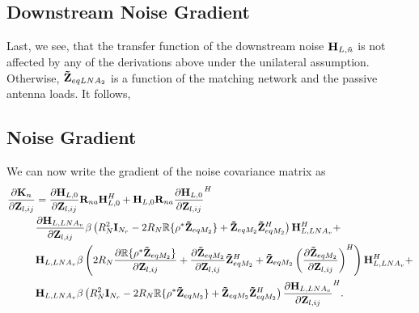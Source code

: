 \subsection{Downstream Noise Gradient}
\label{sec:down_noise_grad}
Last, we see, that the transfer function of the downstream noise $\mathbf{H}_{L,\tilde{n}}$ is not affected by any of the derivations above under the unilateral assumption.
Otherwise, $\mathbf{\tilde{Z}}_{eqLNA_2}$ is a function of the matching network and the passive antenna loads. It follows,

\subsection{Noise Gradient}
We can now write the gradient of the noise covariance matrix as
\begin{align}
\label{eq:noise_grad}\nonumber
\frac{\partial\mat{K}_n}{\partial\mat{Z}_{l,ij}} &= 
\frac{\partial\mat{H}_{L,0}}{\partial\mat{Z}_{l,ij}}\mat{R}_{na}\mat{H}_{L,0}^H +\mat{H}_{L,0}\mat{R}_{na} \frac{\partial\mat{H}_{L,0}}{\partial\mat{Z}_{l,ij}}^H
\\\nonumber
&\frac{\partial\mat{H}_{L,LNA_v}}{\partial\mat{Z}_{l,ij}}\beta\left(R_N^2\mat{I}_{N_r} - 2 R_N\mathbb{R}\{\rho^*\mat{\tilde{Z}}_{eqM_2}\} + \mat{\tilde{Z}}_{eqM_2}\mat{\tilde{Z}}_{eqM_2}^H\right)\mat{H}_{L,LNA_v}^H+
\\\nonumber
&\mat{H}_{L,LNA_v}\beta\left(2 R_N\frac{\partial\mathbb{R}\{\rho^*\mat{\tilde{Z}}_{eqM_2}\}}{\partial\mat{Z}_{l,ij}} +
\frac{\partial\mat{\tilde{Z}}_{eqM_2}}{\partial\mat{Z}_{l,ij}}\mat{\tilde{Z}}_{eqM_2}^H + \mat{\tilde{Z}}_{eqM_2}\left(\frac{\partial\mat{\tilde{Z}}_{eqM_2}}{\partial\mat{Z}_{l,ij}}\right)^H\right)\mat{H}_{L,LNA_v}^H+\\
&\mat{H}_{L,LNA_v}\beta\left(R_N^2\mat{I}_{N_r} - 2 R_N\mathbb{R}\{\rho^*\mat{\tilde{Z}}_{eqM_2}\} + \mat{\tilde{Z}}_{eqM_2}\mat{\tilde{Z}}_{eqM_2}^H\right)\frac{\partial\mat{H}_{L,LNA_v}}{\partial\mat{Z}_{l,ij}}^H.%
\end{align}


